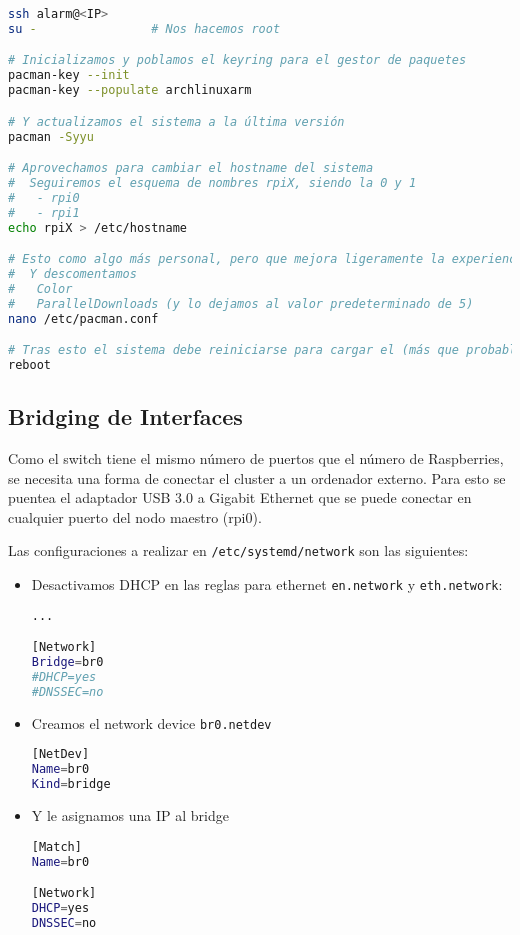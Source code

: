 \begin{lstlisting}[language=bash]
ssh alarm@<IP>
su -                # Nos hacemos root

# Inicializamos y poblamos el keyring para el gestor de paquetes
pacman-key --init
pacman-key --populate archlinuxarm

# Y actualizamos el sistema a la última versión
pacman -Syyu

# Aprovechamos para cambiar el hostname del sistema
#  Seguiremos el esquema de nombres rpiX, siendo la 0 y 1
#   - rpi0
#   - rpi1
echo rpiX > /etc/hostname

# Esto como algo más personal, pero que mejora ligeramente la experiencia en las actualizaciones, editamos el archivo /etc/pacman.conf
#  Y descomentamos
#   Color
#   ParallelDownloads (y lo dejamos al valor predeterminado de 5)
nano /etc/pacman.conf

# Tras esto el sistema debe reiniciarse para cargar el (más que probable) kernel actualizado
reboot
\end{lstlisting}

\subsection{Bridging de Interfaces}
Como el switch tiene el mismo número de puertos que el número de Raspberries, se necesita una forma de conectar el cluster a un ordenador externo. Para esto se puentea el adaptador USB 3.0 a Gigabit Ethernet que se puede conectar en cualquier puerto del nodo maestro (rpi0).

Las configuraciones a realizar en \texttt{/etc/systemd/network} son las siguientes:

\begin{itemize}
    \item Desactivamos DHCP en las reglas para ethernet \texttt{en.network} y \texttt{eth.network}:
\begin{lstlisting}[language=bash]
...

[Network]
Bridge=br0
#DHCP=yes
#DNSSEC=no
\end{lstlisting}
    \item Creamos el network device \texttt{br0.netdev}
\begin{lstlisting}[language=bash]
[NetDev]
Name=br0
Kind=bridge
\end{lstlisting}
    \item Y le asignamos una IP al bridge
\begin{lstlisting}[language=bash]
[Match]
Name=br0

[Network]
DHCP=yes
DNSSEC=no
\end{lstlisting}
\end{itemize}

